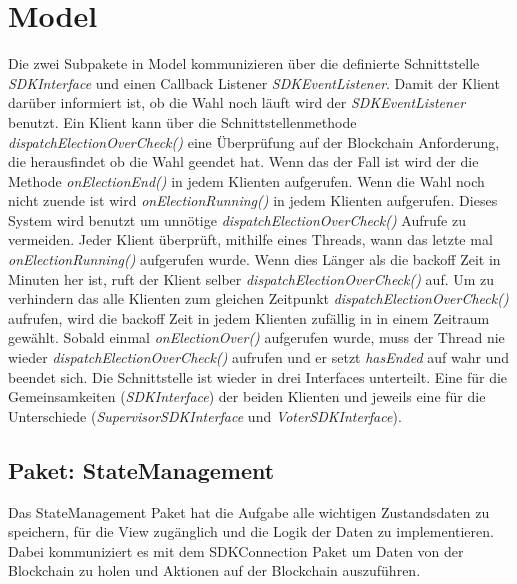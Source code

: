 \documentclass[parskip=full]{scrartcl}
\newcommand{\textitx}[1]{\mbox{\textit{#1}}}
\begin{document}
	\newpage
	\section{Model}
	\pagestyle{plain}
	Die zwei Subpakete in Model kommunizieren über die definierte Schnittstelle \textitx{SDKInterface} und einen Callback Listener \textitx{SDKEventListener}. 
	Damit der Klient darüber informiert ist, ob die Wahl noch läuft wird der \textitx{SDKEventListener} benutzt. Ein Klient kann über die Schnittstellenmethode \textitx{dispatchElectionOverCheck()} eine Überprüfung auf der Blockchain Anforderung, die herausfindet ob die Wahl geendet hat. Wenn das der Fall ist wird der die Methode \textitx{onElectionEnd()} in jedem Klienten aufgerufen. Wenn die Wahl noch nicht zuende ist wird \textitx{onElectionRunning()} in jedem Klienten aufgerufen. Dieses System wird benutzt um unnötige \textitx{dispatchElectionOverCheck()} Aufrufe zu vermeiden. Jeder Klient überprüft, mithilfe eines Threads, wann das letzte mal \textitx{onElectionRunning()} aufgerufen wurde. Wenn dies Länger als die backoff Zeit in Minuten her ist, ruft der Klient selber \textitx{dispatchElectionOverCheck()} auf. Um zu verhindern das alle Klienten zum gleichen Zeitpunkt \textitx{dispatchElectionOverCheck()} aufrufen, wird die backoff Zeit in jedem Klienten zufällig in in einem Zeitraum gewählt. Sobald einmal \textitx{onElectionOver()} aufgerufen wurde, muss der Thread nie wieder \textitx{dispatchElectionOverCheck()} aufrufen und er setzt \textitx{hasEnded} auf wahr und beendet sich.
	Die Schnittstelle ist wieder in drei Interfaces unterteilt. Eine für die Gemeinsamkeiten (\textitx{SDKInterface}) der beiden Klienten und jeweils eine für die Unterschiede (\textitx{SupervisorSDKInterface} und \textitx{VoterSDKInterface}).

	\subsection{Paket: StateManagement}
	Das StateManagement Paket hat die Aufgabe alle wichtigen Zustandsdaten zu speichern, für die View zugänglich und die Logik der Daten zu implementieren.
	Dabei kommuniziert es mit dem SDKConnection Paket um Daten von der Blockchain zu holen und Aktionen auf der Blockchain auszuführen.
	
\end{document}
